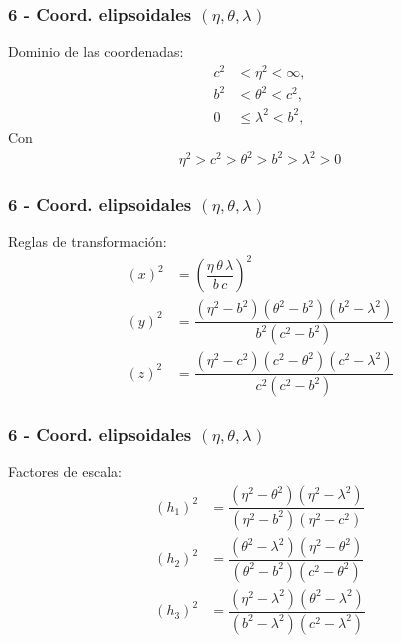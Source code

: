 \documentclass[12pt]{beamer}
\begin{document}
\begin{frame}
\frametitle{6 - Coord. elipsoidales $(\eta, \theta, \lambda)$}
\fontsize{12}{12}\selectfont
Dominio de las coordenadas:
\pause
\begin{align*}
c^{2} &< \eta^{2} < \infty, \\
b^{2} &< \theta^{2} < c^{2}, \\
0 &\leq \lambda^{2} < b^{2},
\end{align*}
Con
\begin{align*}
\eta^{2} > c^{2} > \theta^{2} > b^{2} > \lambda^{2} > 0
\end{align*}
\end{frame}
\begin{frame}
\frametitle{6 - Coord. elipsoidales $(\eta, \theta, \lambda)$}
\fontsize{12}{12}\selectfont
Reglas de transformación:
\pause
\begin{align*}
(x)^{2} &= \left( \dfrac{\eta \, \theta \, \lambda}{b \, c} \right)^{2} \\[0.5em]
(y)^{2} &= \dfrac{(\eta^{2} - b^{2})(\theta^{2} - b^{2})(b^{2} - \lambda^{2})}{b^{2}(c^{2} - b^{2})} \\[0.5em]
(z)^{2} &= \dfrac{(\eta^{2} - c^{2}) (c^{2} - \theta^{2})(c^{2} - \lambda^{2})}{c^{2} (c^{2} - b^{2})}
\end{align*}
\end{frame}
\begin{frame}
\frametitle{6 - Coord. elipsoidales $(\eta, \theta, \lambda)$}
\fontsize{12}{12}\selectfont
Factores de escala:
\pause
\begin{align*}
(h_{1})^{2} &= \dfrac{(\eta^{2} - \theta^{2})(\eta^{2} - \lambda^{2})}{(\eta^{2} - b^{2})(\eta^{2} - c^{2})} \\[0.5em]
(h_{2})^{2} &= \dfrac{(\theta^{2} - \lambda^{2})(\eta^{2} - \theta^{2})}{(\theta^{2} - b^{2})(c^{2} - \theta^{2})} \\[0.5em]
(h_{3})^{2} &= \dfrac{(\eta^{2} - \lambda^{2})(\theta^{2} - \lambda^{2})}{(b^{2} -  \lambda^{2})(c^{2} - \lambda^{2})}
\end{align*}
\end{frame}
\end{document}
